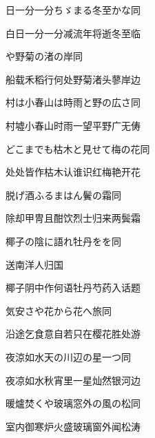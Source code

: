 \begin{haiku}
    {\FH 日一分一分ちゞまる冬至かな}\hfill{\FH 同}

    {\FK 白日一分一分减流年将逝冬至临}
\end{haiku}

\begin{haiku}
    {\FH {}や野菊の渚の岸}\hfill{\FH 同}

    {\FK 船载禾稻行何处野菊渚头蓼岸边}
\end{haiku}

\begin{haiku}
    {\FH 村は小春山は時雨と野の広さ}\hfill{\FH 同}

    {\FK 村墟小春山时雨一望平野广无俦}
\end{haiku}

\begin{haiku}
    {\FH どこまでも枯木と見せて梅の花}\hfill{\FH 同}

    {\FK 处处皆作枯木认谁识红梅艳开花}
\end{haiku}

\begin{haiku}
    {\FH {}脱げ酒ふるまはん鬢の霜}\hfill{\FH 同}

    {\FK 除却甲冑且酣饮烈士归来两鬓霜}
\end{haiku}

\begin{haiku}
    {\FH 椰子の陰に語れ牡丹をを}\hfill{\FH 同}

    {\FK 送南洋人归国}

    {\FK 椰子阴中作何语牡丹芍药入话题}
\end{haiku}

\begin{haiku}
    {\FH 気安さや花から花へ旅}\hfill{\FH 同}

    {\FK 沿途乞食意自若只在樱花胜处游}
\end{haiku}

\begin{haiku}
    {\FH 夜涼如水天の川辺の星一つ}\hfill{\FH 同}

    {\FK 夜凉如水秋宵里一星灿然银河边}
\end{haiku}

\begin{haiku}
    {\FH 暖爐焚くや玻璃窓外の風の松}\hfill{\FH 同}

    {\FK 室内御寒炉火盛玻璃窗外闻松涛}
\end{haiku}

